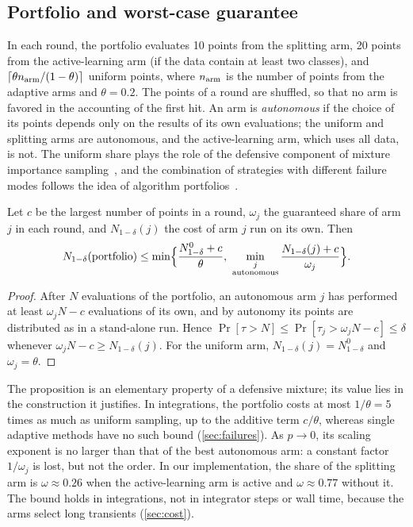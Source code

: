 \subsection{Portfolio and worst-case guarantee}\label{sec:portfolio}

In each round, the portfolio evaluates 10 points from the splitting arm, 20 points from the active-learning arm (if the data contain at least two classes), and $\lceil\theta n_{\rm arm}/(1-\theta)\rceil$ uniform points, where $n_{\rm arm}$ is the number of points from the adaptive arms and $\theta=0.2$. The points of a round are shuffled, so that no arm is favored in the accounting of the first hit. An arm is \emph{autonomous} if the choice of its points depends only on the results of its own evaluations; the uniform and splitting arms are autonomous, and the active-learning arm, which uses all data, is not. The uniform share plays the role of the defensive component of mixture importance sampling~\cite{Hesterberg1995}, and the combination of strategies with different failure modes follows the idea of algorithm portfolios~\cite{Huberman1997,GomesSelman2001}.

\begin{proposition}\label{prop:portfolio}
Let $c$ be the largest number of points in a round, $\omega_j$ the guaranteed share of arm $j$ in each round, and $N_{1-\delta}(j)$ the cost of arm $j$ run on its own. Then
\begin{equation}
N_{1-\delta}(\text{portfolio})\le\min\Bigl\{\frac{N^0_{1-\delta}+c}{\theta},\ \min_{\substack{j\\ \text{autonomous}}}\frac{N_{1-\delta}(j)+c}{\omega_j}\Bigr\}.
\label{eq:portfolio}
\end{equation}
\end{proposition}

\begin{proof}
After $N$ evaluations of the portfolio, an autonomous arm $j$ has performed at least $\omega_jN-c$ evaluations of its own, and by autonomy its points are distributed as in a stand-alone run. Hence $\Pr[\tau>N]\le\Pr[\tau_j>\omega_jN-c]\le\delta$ whenever $\omega_jN-c\ge N_{1-\delta}(j)$. For the uniform arm, $N_{1-\delta}(j)=N^0_{1-\delta}$ and $\omega_j=\theta$.
\end{proof}

The proposition is an elementary property of a defensive mixture; its value lies in the construction it justifies. In integrations, the portfolio costs at most $1/\theta=5$ times as much as uniform sampling, up to the additive term $c/\theta$, whereas single adaptive methods have no such bound (\cref{sec:failures}). As $p\to0$, its scaling exponent is no larger than that of the best autonomous arm: a constant factor $1/\omega_j$ is lost, but not the order. In our implementation, the share of the splitting arm is $\omega\approx0.26$ when the active-learning arm is active and $\omega\approx0.77$ without it. The bound holds in integrations, not in integrator steps or wall time, because the arms select long transients (\cref{sec:cost}).

